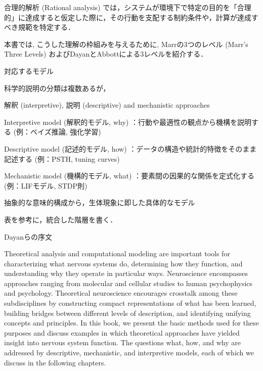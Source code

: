 \documentclass[titlepage]{ltjsbook}
\begin{document}
合理的解析 (Rational analysis) では，システムが環境下で特定の目的を「合理的」に達成すると仮定した際に，その行動を支配する制約条件や，計算が達成すべき規範を特定する．






本書では, こうした理解の枠組みを与えるために, Marrの3つのレベル (Marr's Three Levels) \citep{Marr1982-wk} およびDayanとAbbottによる3レベルを紹介する．

対応するモデル

科学的説明の分類は複数あるが，

解釈 (interpretive), 説明 (descriptive) and mechanistic approaches


Interpretive model (解釈的モデル, why) ：行動や最適性の観点から機構を説明する (例：ベイズ推論, 強化学習) 

Descriptive model (記述的モデル, how) ：データの構造や統計的特徴をそのまま記述する (例：PSTH, tuning curves) 

Mechanistic model (機構的モデル, what) ：要素間の因果的な関係を定式化する (例：LIFモデル, STDP則) 

抽象的な意味的構成から，生体現象に即した具体的なモデル



表を参考に，統合した階層を書く．


%


Dayanらの序文

Theoretical analysis and computational modeling are important tools for characterizing what nervous systems do, determining how they function, and understanding why they operate in particular ways. Neuroscience encompasses approaches ranging from molecular and cellular studies to human psychophysics and psychology. Theoretical neuroscience encourages crosstalk among these subdisciplines by constructing compact representations of what has been learned, building bridges between different levels of description, and identifying unifying concepts and principles. In this book, we present the basic methods used for these purposes and discuss examples in which theoretical approaches have yielded insight into nervous system function. The questions what, how, and why are addressed by descriptive, mechanistic, and interpretive models, each of which we discuss in the following chapters. 
\end{document}
